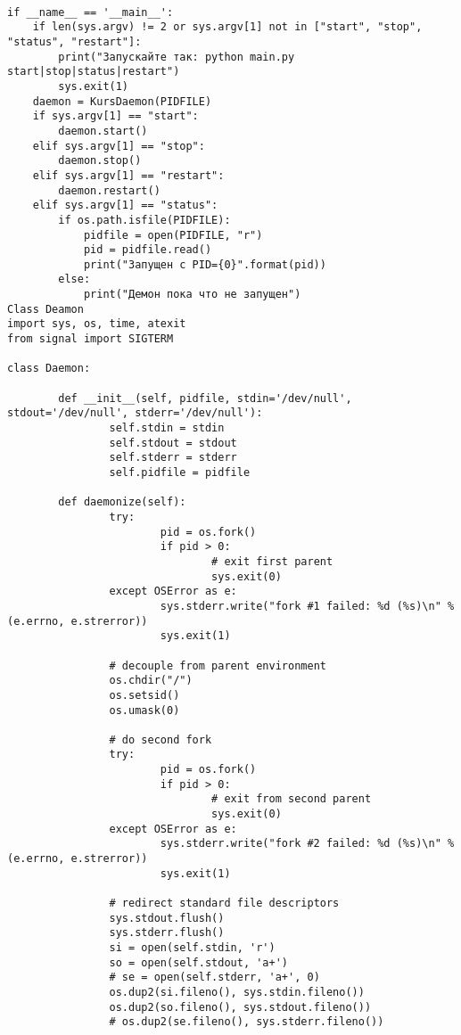 \documentclass[12pt,a4paper]{scrartcl}
\begin{document}
\begin{verbatim}
 
if __name__ == '__main__':
    if len(sys.argv) != 2 or sys.argv[1] not in ["start", "stop", "status", "restart"]:
        print("Запускайте так: python main.py start|stop|status|restart")
        sys.exit(1)
    daemon = KursDaemon(PIDFILE)
    if sys.argv[1] == "start":
        daemon.start()
    elif sys.argv[1] == "stop":
        daemon.stop()
    elif sys.argv[1] == "restart":
        daemon.restart()
    elif sys.argv[1] == "status":
        if os.path.isfile(PIDFILE):
            pidfile = open(PIDFILE, "r")
            pid = pidfile.read()
            print("Запущен с PID={0}".format(pid))
        else:
            print("Демон пока что не запущен")
Class Deamon
import sys, os, time, atexit
from signal import SIGTERM

class Daemon:

        def __init__(self, pidfile, stdin='/dev/null', stdout='/dev/null', stderr='/dev/null'):
                self.stdin = stdin
                self.stdout = stdout
                self.stderr = stderr
                self.pidfile = pidfile

        def daemonize(self):
                try:
                        pid = os.fork()
                        if pid > 0:
                                # exit first parent
                                sys.exit(0)
                except OSError as e:
                        sys.stderr.write("fork #1 failed: %d (%s)\n" % (e.errno, e.strerror))
                        sys.exit(1)

                # decouple from parent environment
                os.chdir("/")
                os.setsid()
                os.umask(0)

                # do second fork
                try:
                        pid = os.fork()
                        if pid > 0:
                                # exit from second parent
                                sys.exit(0)
                except OSError as e:
                        sys.stderr.write("fork #2 failed: %d (%s)\n" % (e.errno, e.strerror))
                        sys.exit(1)

                # redirect standard file descriptors
                sys.stdout.flush()
                sys.stderr.flush()
                si = open(self.stdin, 'r')
                so = open(self.stdout, 'a+')
                # se = open(self.stderr, 'a+', 0)
                os.dup2(si.fileno(), sys.stdin.fileno())
                os.dup2(so.fileno(), sys.stdout.fileno())
                # os.dup2(se.fileno(), sys.stderr.fileno())


\end{verbatim}
\end{document}
